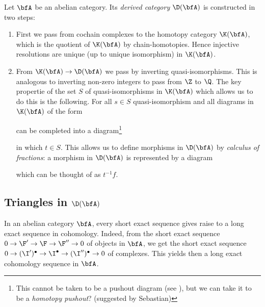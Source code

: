 \documentclass[A4paper, british]{amsart}
\theoremstyle{darkgreentheorem}
\theoremstyle{darkbluedefinition}
\theoremstyle{darkredexample}
\theoremstyle{remark}
\newcommand{\1}{\mathbbm{1}}
\newcommand{\grd}{^{\bullet}}
\begin{document}
Let $\bfA$ be an abelian category.
Its \textit{derived category} $\D(\bfA)$ is constructed in two steps:
\begin{enumerate}
    \item First we pass from cochain complexes to the homotopy category $\K(\bfA)$, which is the quotient of $\K(\bfA)$ by chain-homotopies.
	Hence injective resolutions are unique (up to unique isomorphism) in $\K(\bfA)$.
    \item From $\K(\bfA)\to \D(\bfA)$ we pass by inverting quasi-isomorphisms.
	This is analogous to inverting non-zero integers to pass from $\Z$ to $\Q$.
	The key propertie of the set $S$ of quasi-isomorphisms in $\K(\bfA)$ which allows us to do this is the following.
	For all $s\in S$ quasi-isomorphism and all diagrams in $\K(\bfA)$ of the form
	\begin{center}
	\end{center}
	can be completed into a diagram\footnote{This cannot be taken to be a pushout diagram (see \cite[Exercise 2.19]{huy06}), but we can take it to be a \textit{homotopy pushout}? (suggested by Sebastian)}
	\begin{center}
	\end{center}
	in which $t\in S$.
	This allows us to define morphisms in $\D(\bfA)$ by \textit{calculus of fractions}: a morphism in $\D(\bfA)$ is represented by a diagram
	\begin{center}
	\end{center}
	which can be thought of as $t^{-1}f$.
\end{enumerate}

\subsection{Triangles in $\D(\bfA)$}

In an abelian category $\bfA$, every short exact sequence gives raise to a long exact sequence in cohomology.
Indeed, from the short exact sequence $0\to \F'\to \F\to \F''\to 0$ of objects in $\bfA$, we get the short exact sequence $0\to (\I')\grd\to \I\grd\to (\I'')\grd\to 0$ of complexes.
This yields then a long exact cohomology sequence in $\bfA$.
\end{document}
